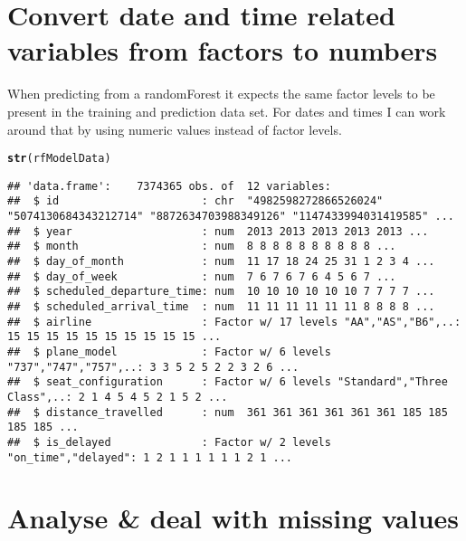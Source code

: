 \documentclass{article}\usepackage[]{graphicx}\usepackage[]{color}
\makeatletter
\newcommand{\hlstd}[1]{\textcolor[rgb]{0.345,0.345,0.345}{#1}}%
\newcommand{\hlkwd}[1]{\textcolor[rgb]{0.737,0.353,0.396}{\textbf{#1}}}%
\newenvironment{kframe}{%
 \def\at@end@of@kframe{}%
 \ifinner\ifhmode%
  \def\at@end@of@kframe{\end{minipage}}%
  \begin{minipage}{\columnwidth}%
 \fi\fi%
 \def\FrameCommand##1{\hskip\@totalleftmargin \hskip-\fboxsep
 \colorbox{shadecolor}{##1}\hskip-\fboxsep
     \hskip-\linewidth \hskip-\@totalleftmargin \hskip\columnwidth}%
 \MakeFramed {\advance\hsize-\width
   \@totalleftmargin\z@ \linewidth\hsize
   \@setminipage}}%
 {\par\unskip\endMakeFramed%
 \at@end@of@kframe}
\newenvironment{knitrout}{}{} %
\makeatother
\begin{document}
\section{Convert date and time related variables from factors to numbers}
When predicting from a randomForest it expects the same factor levels to be present in the training and prediction data set. For dates and times I can work around that by using numeric values instead of factor levels.

\begin{knitrout}
\color{fgcolor}\begin{kframe}
\begin{alltt}
\hlkwd{str}\hlstd{(rfModelData)}
\end{alltt}
\begin{verbatim}
## 'data.frame':	7374365 obs. of  12 variables:
##  $ id                      : chr  "4982598272866526024" "5074130684343212714" "8872634703988349126" "1147433994031419585" ...
##  $ year                    : num  2013 2013 2013 2013 2013 ...
##  $ month                   : num  8 8 8 8 8 8 8 8 8 8 ...
##  $ day_of_month            : num  11 17 18 24 25 31 1 2 3 4 ...
##  $ day_of_week             : num  7 6 7 6 7 6 4 5 6 7 ...
##  $ scheduled_departure_time: num  10 10 10 10 10 10 7 7 7 7 ...
##  $ scheduled_arrival_time  : num  11 11 11 11 11 11 8 8 8 8 ...
##  $ airline                 : Factor w/ 17 levels "AA","AS","B6",..: 15 15 15 15 15 15 15 15 15 15 ...
##  $ plane_model             : Factor w/ 6 levels "737","747","757",..: 3 3 5 2 5 2 2 3 2 6 ...
##  $ seat_configuration      : Factor w/ 6 levels "Standard","Three Class",..: 2 1 4 5 4 5 2 1 5 2 ...
##  $ distance_travelled      : num  361 361 361 361 361 361 185 185 185 185 ...
##  $ is_delayed              : Factor w/ 2 levels "on_time","delayed": 1 2 1 1 1 1 1 1 2 1 ...
\end{verbatim}
\end{kframe}
\end{knitrout}


\section{Analyse \& deal with missing values}
\end{document}
